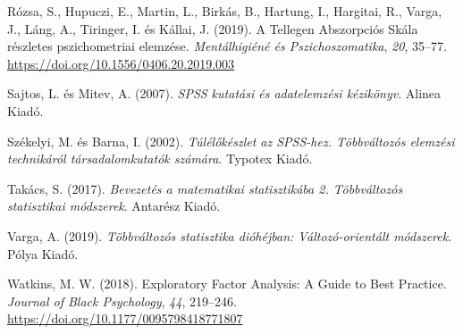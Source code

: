 \documentclass[
  letterpaper,
]{krantz}
\newlength{\cslhangindent}
\newlength{\cslentryspacingunit} %
\newenvironment{CSLReferences}[2] %
 {%
  \setlength{\parindent}{0pt}
  \ifodd #1
  \let\oldpar\par
  \def\par{\hangindent=\cslhangindent\oldpar}
  \fi
  \setlength{\parskip}{#2\cslentryspacingunit}
 }%
 {}
\begin{document}
\begin{CSLReferences}{1}{0}
\leavevmode{}%
Rózsa, S., Hupuczi, E., Martin, L., Birkás, B., Hartung, I., Hargitai,
R., Varga, J., Láng, A., Tiringer, I. és Kállai, J. (2019). A Tellegen
Abszorpciós Skála részletes pszichometriai elemzése. \emph{Mentálhigiéné
és Pszichoszomatika}, \emph{20}, 35--77.
\url{https://doi.org/10.1556/0406.20.2019.003}

\leavevmode{}%
Sajtos, L. és Mitev, A. (2007). \emph{SPSS kutatási és adatelemzési
kézikönyv}. Alinea Kiadó.

\leavevmode{}%
Székelyi, M. és Barna, I. (2002). \emph{Túlélőkészlet az SPSS-hez.
Többváltozós elemzési technikáról társadalomkutatók számára}. Typotex
Kiadó.

\leavevmode{}%
Takács, S. (2017). \emph{Bevezetés a matematikai statisztikába 2.
Többváltozós statisztikai módszerek}. Antarész Kiadó.

\leavevmode{}%
Varga, A. (2019). \emph{Többváltozós statisztika dióhéjban:
Változó-orientált módszerek}. Pólya Kiadó.

\leavevmode{}%
Watkins, M. W. (2018). Exploratory Factor Analysis: A Guide to Best
Practice. \emph{Journal of Black Psychology}, \emph{44}, 219--246.
\url{https://doi.org/10.1177/0095798418771807}

\end{CSLReferences}



\backmatter
\printindex
\end{document}
